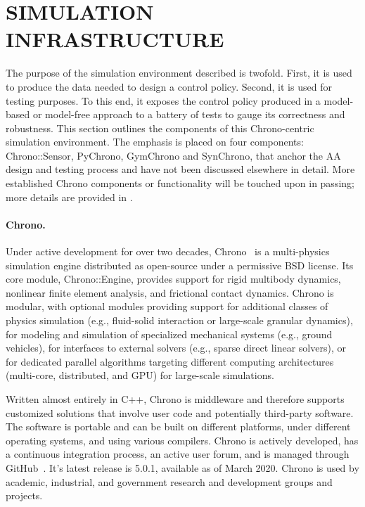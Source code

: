 \documentclass[12pt,twocolumn]{article}
\begin{document}
\section{SIMULATION INFRASTRUCTURE}
\label{sec:simInfrastructure}
The purpose of the simulation environment described is twofold. First, it is used to produce the data needed to design a control policy. Second, it is used for testing purposes. To this end, it exposes the control policy produced in a model-based or model-free approach to a battery of tests to gauge its correctness and robustness. This section outlines the components of this Chrono-centric simulation environment. The emphasis is placed on four components: Chrono::Sensor, PyChrono, GymChrono and SynChrono, that anchor the AA design and testing process and have not been discussed elsewhere in detail. More established Chrono components or functionality will be touched upon in passing; more details are provided in  \cite{chronoOverview2016,ChronoVehicle2019,ChronoSCM2019}.

\paragraph{Chrono.} Under active development for over two decades, Chrono~\cite{chronoOverview2016} is a multi-physics simulation engine distributed as open-source under a permissive BSD license.  Its core module, Chrono::Engine, provides support for rigid multibody dynamics, nonlinear finite element analysis, and frictional contact dynamics. Chrono is modular, with optional modules providing support for additional classes of physics simulation (e.g., fluid-solid interaction or large-scale granular dynamics), for modeling and simulation of specialized mechanical systems (e.g., ground vehicles), for interfaces to external solvers (e.g., sparse direct linear solvers), or for dedicated parallel algorithms targeting different computing architectures (multi-core, distributed, and GPU) for large-scale simulations.

Written almost entirely in C++, Chrono is middleware and therefore supports customized solutions that involve user code and potentially third-party software. The software is portable and can be built on different platforms, under different operating systems, and using various compilers. Chrono is actively developed, has a continuous integration process, an active user forum, and is managed through GitHub~\cite{projectChronoGithub}. It's latest release is 5.0.1, available as of March 2020.  Chrono is used by academic, industrial, and government research and development groups and projects.
\end{document}
